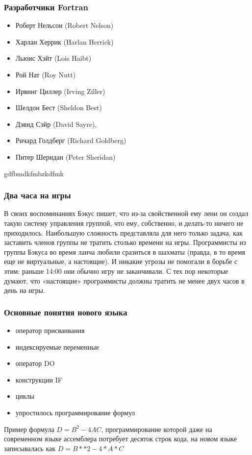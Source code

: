 \documentclass{beamer}
\begin{document}
\begin{frame}
\frametitle{Разработчики Fortran}
\begin{itemize}
	\item Роберт Нельсон (Robert Nelson) 
	\item Харлан Херрик (Harlan Herrick)
	\item Льюис Хэйт (Lois Haibt)
	\item Рой Нат (Roy Nutt)
	\item Ирвинг Циллер (Irving Ziller)
	\item Шелдон Бест (Sheldon Best)
	\item Дэвид Сэйр (David Sayre), 
	\item Ричард Голдберг (Richard Goldberg)
	\item Питер Шеридан (Peter Sheridan)
\end{itemize}

\end{frame}
 gdfbmdkfmbzkdfmk
\begin{frame}
\frametitle{Два часа на игры}
В своих воспоминаниях Бэкус пишет, что из-за свойственной ему лени он создал такую систему управления группой, что ему, собственно, и делать-то ничего не приходилось. Наибольшую сложность представляла для него только задача, как заставить членов группы не тратить столько времени на игры. Программисты из группы Бэкуса во время ланча любили сразиться в шахматы (правда, в то время еще не виртуальные, а настоящие). И никакие угрозы не помогали в борьбе с этим: раньше 14:00 они обычно игру не заканчивали. С тех пор некоторые думают, что «настоящие» программисты должны тратить не менее двух часов в день на игры.

\end{frame}

\begin{frame}
\frametitle{Основные понятия нового языка}
\begin{itemize}
	\item оператор присваивания
	\item индексируемые переменные
	\item оператор DO
	\item конструкции IF
	\item циклы
	\item упростилось программирование формул
\end{itemize}

\begin{exampleblock}{Пример}
формула $D=B^2-4AC$, программирование которой даже на современном языке ассемблера потребует десяток строк кода, на новом языке записывалась как $D=B**2-4*A*C$
\end{exampleblock}
\end{frame}
\end{document}

